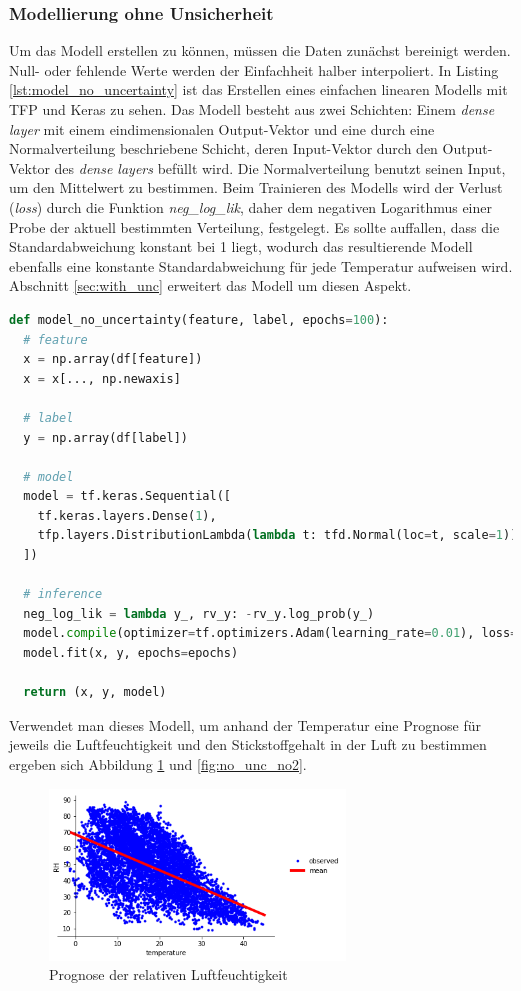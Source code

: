 \documentclass[12pt]{article}
\begin{document}
\subsubsection{Modellierung ohne Unsicherheit}
\label{sec:no_unc}

Um das Modell erstellen zu können, müssen die Daten zunächst bereinigt werden. Null- oder fehlende Werte werden der Einfachheit halber interpoliert. In Listing \ref{lst:model_no_uncertainty} ist das Erstellen eines einfachen linearen Modells mit TFP und Keras zu sehen. Das Modell besteht aus zwei Schichten: Einem \textit{dense layer} mit einem eindimensionalen Output-Vektor und eine durch eine Normalverteilung beschriebene Schicht, deren Input-Vektor durch den Output-Vektor des \textit{dense layers} befüllt wird. Die Normalverteilung benutzt seinen Input, um den Mittelwert zu bestimmen. Beim Trainieren des Modells wird der Verlust (\textit{loss}) durch die Funktion \textit{neg\_log\_lik}, daher dem negativen Logarithmus einer Probe der aktuell bestimmten Verteilung, festgelegt. Es sollte auffallen, dass die Standardabweichung konstant bei 1 liegt, wodurch das resultierende Modell ebenfalls eine konstante Standardabweichung für jede Temperatur aufweisen wird. Abschnitt \ref{sec:with_unc} erweitert das Modell um diesen Aspekt.

\begin{lstlisting}[language=Python, caption={Modell mit Keras ohne Unsicherheit}, label={lst:model_no_uncertainty}]
def model_no_uncertainty(feature, label, epochs=100):
  # feature
  x = np.array(df[feature])
  x = x[..., np.newaxis]

  # label
  y = np.array(df[label])
  
  # model
  model = tf.keras.Sequential([
    tf.keras.layers.Dense(1),
    tfp.layers.DistributionLambda(lambda t: tfd.Normal(loc=t, scale=1)),
  ])

  # inference
  neg_log_lik = lambda y_, rv_y: -rv_y.log_prob(y_)
  model.compile(optimizer=tf.optimizers.Adam(learning_rate=0.01), loss=neg_log_lik)
  model.fit(x, y, epochs=epochs)
  
  return (x, y, model)
\end{lstlisting}

Verwendet man dieses Modell, um anhand der Temperatur eine Prognose für jeweils die Luftfeuchtigkeit und den Stickstoffgehalt in der Luft zu bestimmen ergeben sich Abbildung \ref{fig:no_unc_rh} und \ref{fig:no_unc_no2}.

\begin{figure}[h]
    \centering
    \includegraphics[width=0.7\textwidth]{./figs/no_unc_rh.png}
    \caption{Prognose der relativen Luftfeuchtigkeit}
    \label{fig:no_unc_rh}
\end{figure}
\end{document}
